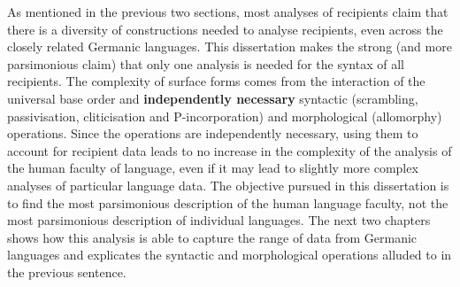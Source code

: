 As mentioned in the previous two sections, most analyses of recipients claim that there is a diversity of constructions needed to analyse recipients, even across the closely related Germanic languages. This dissertation makes the strong (and more parsimonious claim) that only one analysis is needed for the syntax of all recipients. The complexity of surface forms comes from the interaction of the universal base order and \textbf{independently necessary} syntactic (scrambling, passivisation, cliticisation and P-incorporation) and morphological (allomorphy) operations. Since the operations are independently necessary, using them to account for recipient data leads to no increase in the complexity of the analysis of the human faculty of language, even if it may lead to slightly more complex analyses of particular language data. The objective pursued in this dissertation is to find the most parsimonious description of the human language faculty, not the most parsimonious description of individual languages. The next two chapters shows how this analysis is able to capture the range of data from Germanic languages and explicates the syntactic and morphological operations alluded to in the previous sentence.

%
